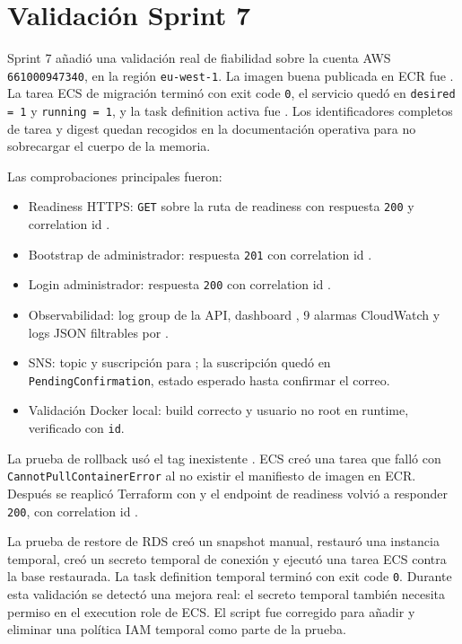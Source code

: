 \section{Validación Sprint 7}
\label{sec:validacion-sprint7}

Sprint 7 añadió una validación real de fiabilidad sobre la cuenta AWS \texttt{661000947340}, en la región \texttt{eu-west-1}. La imagen buena publicada en ECR fue . La tarea ECS de migración terminó con exit code \texttt{0}, el servicio quedó en \texttt{desired = 1} y \texttt{running = 1}, y la task definition activa fue . Los identificadores completos de tarea y digest quedan recogidos en la documentación operativa para no sobrecargar el cuerpo de la memoria.

Las comprobaciones principales fueron:

\begin{itemize}
  \item Readiness HTTPS: \texttt{GET} sobre la ruta de readiness con respuesta \texttt{200} y correlation id .
  \item Bootstrap de administrador: respuesta \texttt{201} con correlation id .
  \item Login administrador: respuesta \texttt{200} con correlation id .
  \item Observabilidad: log group de la API, dashboard , 9 alarmas CloudWatch y logs JSON filtrables por .
  \item SNS: topic y suscripción para ; la suscripción quedó en \texttt{PendingConfirmation}, estado esperado hasta confirmar el correo.
  \item Validación Docker local: build correcto y usuario no root en runtime, verificado con \texttt{id}.
\end{itemize}

La prueba de rollback usó el tag inexistente . ECS creó una tarea que falló con \texttt{CannotPullContainerError} al no existir el manifiesto de imagen en ECR. Después se reaplicó Terraform con  y el endpoint de readiness volvió a responder \texttt{200}, con correlation id .

La prueba de restore de RDS creó un snapshot manual, restauró una instancia temporal, creó un secreto temporal de conexión y ejecutó una tarea ECS  contra la base restaurada. La task definition temporal  terminó con exit code \texttt{0}. Durante esta validación se detectó una mejora real: el secreto temporal también necesita permiso  en el execution role de ECS. El script fue corregido para añadir y eliminar una política IAM temporal como parte de la prueba.

